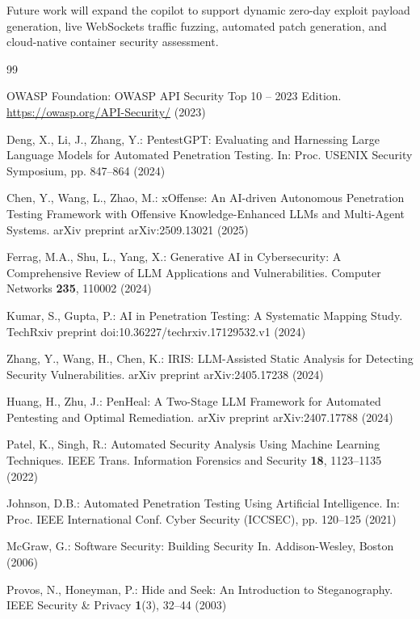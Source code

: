 \documentclass[journal]{IEEEtran}
\begin{document}
Future work will expand the copilot to support dynamic zero-day exploit payload generation, live WebSockets traffic fuzzing, automated patch generation, and cloud-native container security assessment.


\begin{thebibliography}{99}

OWASP Foundation: OWASP API Security Top 10 -- 2023 Edition. \url{https://owasp.org/API-Security/} (2023)

Deng, X., Li, J., Zhang, Y.: PentestGPT: Evaluating and Harnessing Large Language Models for Automated Penetration Testing. In: Proc. USENIX Security Symposium, pp. 847--864 (2024)

Chen, Y., Wang, L., Zhao, M.: xOffense: An AI-driven Autonomous Penetration Testing Framework with Offensive Knowledge-Enhanced LLMs and Multi-Agent Systems. arXiv preprint arXiv:2509.13021 (2025)

Ferrag, M.A., Shu, L., Yang, X.: Generative AI in Cybersecurity: A Comprehensive Review of LLM Applications and Vulnerabilities. Computer Networks \textbf{235}, 110002 (2024)

Kumar, S., Gupta, P.: AI in Penetration Testing: A Systematic Mapping Study. TechRxiv preprint doi:10.36227/techrxiv.17129532.v1 (2024)

Zhang, Y., Wang, H., Chen, K.: IRIS: LLM-Assisted Static Analysis for Detecting Security Vulnerabilities. arXiv preprint arXiv:2405.17238 (2024)

Huang, H., Zhu, J.: PenHeal: A Two-Stage LLM Framework for Automated Pentesting and Optimal Remediation. arXiv preprint arXiv:2407.17788 (2024)

Patel, K., Singh, R.: Automated Security Analysis Using Machine Learning Techniques. IEEE Trans. Information Forensics and Security \textbf{18}, 1123--1135 (2022)

Johnson, D.B.: Automated Penetration Testing Using Artificial Intelligence. In: Proc. IEEE International Conf. Cyber Security (ICCSEC), pp. 120--125 (2021)

McGraw, G.: Software Security: Building Security In. Addison-Wesley, Boston (2006)

Provos, N., Honeyman, P.: Hide and Seek: An Introduction to Steganography. IEEE Security \& Privacy \textbf{1}(3), 32--44 (2003)


\end{thebibliography}
\end{document}
